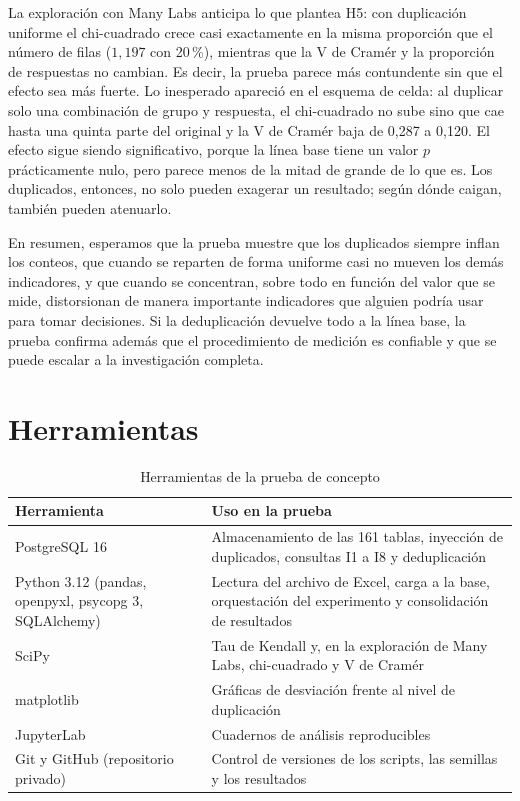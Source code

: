 \documentclass[11pt,openany,oneside,letterpaper]{book}
\begin{document}
La exploración con Many Labs anticipa lo que plantea H5: con duplicación uniforme el chi-cuadrado crece casi exactamente en la misma proporción que el número de filas ($1{,}197$ con 20\,\%), mientras que la V de Cramér y la proporción de respuestas no cambian. Es decir, la prueba parece más contundente sin que el efecto sea más fuerte. Lo inesperado apareció en el esquema de celda: al duplicar solo una combinación de grupo y respuesta, el chi-cuadrado no sube sino que cae hasta una quinta parte del original y la V de Cramér baja de 0,287 a 0,120. El efecto sigue siendo significativo, porque la línea base tiene un valor $p$ prácticamente nulo, pero parece menos de la mitad de grande de lo que es. Los duplicados, entonces, no solo pueden exagerar un resultado; según dónde caigan, también pueden atenuarlo.

En resumen, esperamos que la prueba muestre que los duplicados siempre inflan los conteos, que cuando se reparten de forma uniforme casi no mueven los demás indicadores, y que cuando se concentran, sobre todo en función del valor que se mide, distorsionan de manera importante indicadores que alguien podría usar para tomar decisiones. Si la deduplicación devuelve todo a la línea base, la prueba confirma además que el procedimiento de medición es confiable y que se puede escalar a la investigación completa.

\section{Herramientas}

\begin{table}[H]
\centering
\caption{Herramientas de la prueba de concepto}
\label{tab:herramientas}
\small
\begin{tabularx}{\textwidth}{>{\raggedright\arraybackslash}p{5cm} X}
\toprule
\textbf{Herramienta} & \textbf{Uso en la prueba} \\
\midrule
PostgreSQL 16 & Almacenamiento de las 161 tablas, inyección de duplicados, consultas I1 a I8 y deduplicación \\
Python 3.12 (pandas, openpyxl, psycopg 3, SQLAlchemy) & Lectura del archivo de Excel, carga a la base, orquestación del experimento y consolidación de resultados \\
SciPy & Tau de Kendall y, en la exploración de Many Labs, chi-cuadrado y V de Cramér \\
matplotlib & Gráficas de desviación frente al nivel de duplicación \\
JupyterLab & Cuadernos de análisis reproducibles \\
Git y GitHub (repositorio privado) & Control de versiones de los scripts, las semillas y los resultados \\
\bottomrule
\end{tabularx}
\end{table}
\end{document}
